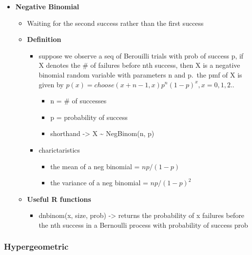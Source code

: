 \documentclass[
]{article}
\providecommand{\tightlist}{%
  \setlength{\itemsep}{0pt}\setlength{\parskip}{0pt}}
\begin{document}
\begin{itemize}
\tightlist
\item
  \textbf{Negative Binomial}

  \begin{itemize}
  \tightlist
  \item
    Waiting for the second success rather than the first success
  \item
    \textbf{Definition}

    \begin{itemize}
    \tightlist
    \item
      suppose we observe a seq of Berouilli trials with prob of success
      p, if X denotes the \# of failures before nth success, then X is a
      negative binomial random variable with parameters n and p.~the pmf
      of X is given by
      \(p(x) = choose(x + n - 1, x)p^{n}(1-p)^{x}, x = 0, 1, 2..\)

      \begin{itemize}
      \tightlist
      \item
        n = \# of successes
      \item
        p = probability of success
      \item
        shorthand -\textgreater{} X \textasciitilde{} NegBinom(n, p)
      \end{itemize}
    \item
      charictaristics

      \begin{itemize}
      \tightlist
      \item
        the mean of a neg binomial = \(np/(1-p)\)
      \item
        the variance of a neg binomial = \(np/(1-p)^{2}\)
      \end{itemize}
    \end{itemize}
  \item
    \textbf{Useful R functions}

    \begin{itemize}
    \tightlist
    \item
      dnbinom(x, size, prob) -\textgreater{} returns the probability of
      x failures before the nth success in a Bernoulli process with
      probability of success prob
    \end{itemize}
  \end{itemize}
\end{itemize}

\hypertarget{hypergeometric}{%
\subsubsection{Hypergeometric}\label{hypergeometric}}
\end{document}

